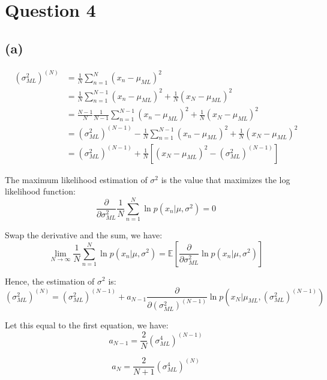 \documentclass[a4paper,12pt]{article}
\newcommand{\pard}[2]{\frac{\partial #1}{\partial #2}}
\begin{document}
\section*{Question 4}

\subsection*{(a)}

\begin{align*}
	(\sigma^2_{ML})^{(N)} &= \frac{1}{N}\sum_{n=1}^{N}(x_n - \mu_{ML})^2 \\
	&= \frac{1}{N}\sum_{n=1}^{N-1}(x_n - \mu_{ML})^2 + \frac{1}{N}(x_N - \mu_{ML})^2 \\
	&= \frac{N-1}{N}\frac{1}{N-1}\sum_{n=1}^{N-1}(x_n - \mu_{ML})^2 + \frac{1}{N}(x_N - \mu_{ML})^2 \\
	&= (\sigma^2_{ML})^{(N-1)} - \frac{1}{N}\sum_{n=1}^{N-1}(x_n - \mu_{ML})^2 + \frac{1}{N}(x_N - \mu_{ML})^2 \\
	&= (\sigma^2_{ML})^{(N-1)} + \frac{1}{N}[(x_N - \mu_{ML})^2 - (\sigma^2_{ML})^{(N-1)}]
\end{align*}

The maximum likelihood estimation of $\sigma^2$ is the value that maximizes the log likelihood function:
\begin{equation*}
	\pard{}{\sigma^2_{ML}} \frac{1}{N}\sum_{n=1}^{N}\ln p(x_n|\mu, \sigma^2) = 0
\end{equation*}

Swap the derivative and the sum, we have:
\begin{equation*}
	\lim_{N\to\infty} \frac{1}{N}\sum_{n=1}^{N}\ln p(x_n|\mu, \sigma^2) = \mathbb{E}[\pard{}{\sigma^2_{ML}}\ln p(x_n|\mu, \sigma^2)]
\end{equation*}

Hence, the estimation of $\sigma^2$ is:
\begin{equation*}
	(\sigma^2_{ML})^{(N)} = (\sigma^2_{ML})^{(N-1)} + a_{N-1}\pard{}{(\sigma^2_{ML})^{(N-1)}}\ln p(x_N|\mu_{ML}, (\sigma^2_{ML})^{(N-1)})
\end{equation*}

Let this equal to the first equation, we have:
\begin{equation*}
	a_{N-1} = \frac{2}{N} (\sigma^4_{ML})^{(N-1)}
\end{equation*}

\begin{equation*}
	a_{N} = \frac{2}{N+1} (\sigma^4_{ML})^{(N)}
\end{equation*}
\end{document}
